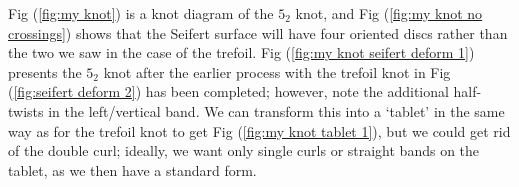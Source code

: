 \documentclass{article}
\begin{document}
{%
 Fig (\ref{fig:my knot}) is a knot diagram of the $5_2$ knot, and Fig (\ref{fig:my knot no crossings}) shows that the Seifert surface will have four oriented discs rather than the two we saw in the case of the trefoil. Fig (\ref{fig:my knot seifert deform 1}) presents the $5_2$ knot after the earlier process with the trefoil knot in Fig (\ref{fig:seifert deform 2}) has been completed; however, note the additional half-twists in the left/vertical band. We can transform this into a `tablet' in the same way as for the trefoil knot to get Fig (\ref{fig:my knot tablet 1}), but we could get rid of the double curl; ideally, we want only single curls or straight bands on the tablet, as  we then have a standard form.\\

}
\end{document}
